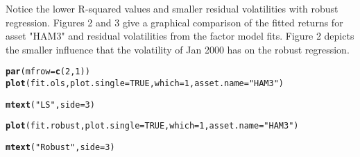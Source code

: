 \documentclass[a4paper]{article}\usepackage[]{graphicx}\usepackage[]{color}
\makeatletter
\newcommand{\hlnum}[1]{\textcolor[rgb]{0.686,0.059,0.569}{#1}}%
\newcommand{\hlstr}[1]{\textcolor[rgb]{0.192,0.494,0.8}{#1}}%
\newcommand{\hlstd}[1]{\textcolor[rgb]{0.345,0.345,0.345}{#1}}%
\newcommand{\hlkwc}[1]{\textcolor[rgb]{0.333,0.667,0.333}{#1}}%
\newcommand{\hlkwd}[1]{\textcolor[rgb]{0.737,0.353,0.396}{\textbf{#1}}}%
\newenvironment{kframe}{%
 \def\at@end@of@kframe{}%
 \ifinner\ifhmode%
  \def\at@end@of@kframe{\end{minipage}}%
  \begin{minipage}{\columnwidth}%
 \fi\fi%
 \def\FrameCommand##1{\hskip\@totalleftmargin \hskip-\fboxsep
 \colorbox{shadecolor}{##1}\hskip-\fboxsep
     \hskip-\linewidth \hskip-\@totalleftmargin \hskip\columnwidth}%
 \MakeFramed {\advance\hsize-\width
   \@totalleftmargin\z@ \linewidth\hsize
   \@setminipage}}%
 {\par\unskip\endMakeFramed%
 \at@end@of@kframe}
\newenvironment{knitrout}{}{} %
\makeatother
\begin{document}
Notice the lower R-squared values and smaller residual volatilities with robust regression. Figures 2 and 3 give a graphical comparison of the fitted returns for asset "HAM3" and residual volatilities from the factor model fits. Figure 2 depicts the smaller influence that the volatility of Jan 2000 has on the robust regression.
\begin{knitrout}
\color{fgcolor}\begin{kframe}
\begin{alltt}
\hlkwd{par}\hlstd{(}\hlkwc{mfrow}\hlstd{=}\hlkwd{c}\hlstd{(}\hlnum{2}\hlstd{,}\hlnum{1}\hlstd{))}
\hlkwd{plot}\hlstd{(fit.ols,} \hlkwc{plot.single}\hlstd{=}\hlnum{TRUE}\hlstd{,} \hlkwc{which}\hlstd{=}\hlnum{1}\hlstd{,} \hlkwc{asset.name}\hlstd{=}\hlstr{"HAM3"}\hlstd{)}
\end{alltt}


{\ttfamily\noindent\bfseries{}}\begin{alltt}
\hlkwd{mtext}\hlstd{(}\hlstr{"LS"}\hlstd{,} \hlkwc{side}\hlstd{=}\hlnum{3}\hlstd{)}
\end{alltt}


{\ttfamily\noindent\bfseries{}}\begin{alltt}
\hlkwd{plot}\hlstd{(fit.robust,} \hlkwc{plot.single}\hlstd{=}\hlnum{TRUE}\hlstd{,} \hlkwc{which}\hlstd{=}\hlnum{1}\hlstd{,} \hlkwc{asset.name}\hlstd{=}\hlstr{"HAM3"}\hlstd{)}
\end{alltt}


{\ttfamily\noindent\bfseries{}}\begin{alltt}
\hlkwd{mtext}\hlstd{(}\hlstr{"Robust"}\hlstd{,} \hlkwc{side}\hlstd{=}\hlnum{3}\hlstd{)}
\end{alltt}


{\ttfamily\noindent\bfseries{}}\end{kframe}
\end{knitrout}
\end{document}
